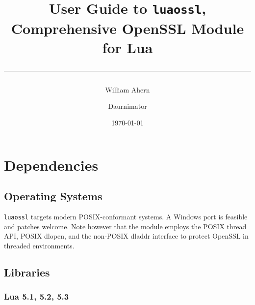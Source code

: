 \documentclass[11pt, oneside]{memoir}
\newcommand*{\luaossl}[0]{\texttt{luaossl}\xspace}
\begin{document}

\title{

\vspace*{10ex}

\HUGE\sffamily User Guide to \luaossl, \\


\HUGE Comprehensive OpenSSL Module for Lua \\

\vspace*{30pt}
\hrule
}

\date{\today}
\author{
	William Ahern
	\and
	Daurnimator
}
\maketitle
\thispagestyle{empty}
\clearpage

\setcounter{page}{1}
\tableofcontents

\clearpage

\setcounter{page}{1}

\setlength{\beforechapskip}{1ex}
\setlength{\afterchapskip}{1ex}

\chapter{Dependencies}

\section{Operating Systems}

\luaossl targets modern POSIX-conformant systems. A Windows port is feasible and patches welcome.
Note however that the module employs the POSIX thread API, POSIX dlopen, and the non-POSIX dladdr interface to protect OpenSSL in threaded environments.

\section{Libraries}

\subsection{Lua 5.1, 5.2, 5.3}
\end{document}
